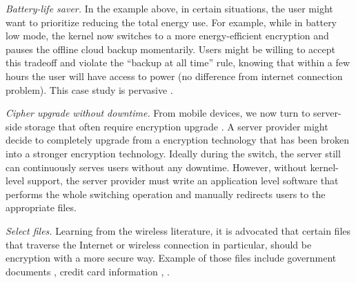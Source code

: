 {\em Battery-life saver.} In the example above, in certain situations, the user
might want to prioritize reducing the total energy use. For example, while in
battery low mode, the kernel now switches to a more energy-efficient encryption
and pauses the offline cloud backup momentarily. Users might be willing to
accept this tradeoff and violate the ``backup at all time'' rule, knowing that
within a few hours the user will have access to power (no difference from
internet connection problem). This case study is pervasive \cite{hackernews-???,
many-more??}.

{\em Cipher upgrade without downtime.} From mobile devices, we now turn to
server-side storage that often require encryption upgrade \cite{some-citations}.
A server provider might decide to completely upgrade from a encryption
technology that has been broken into a stronger encryption technology. Ideally
during the switch, the server still can continuously serves users without any
downtime. However, without kernel-level support, the server provider must write
an application level software that performs the whole switching operation and
manually redirects users to the appropriate files.

{\em Select files.} Learning from the wireless literature, it is advocated that
certain files that traverse the Internet or wireless connection in particular,
should be encryption with a more secure way. Example of those files include
government documents \cite{citation-to-this-example}, credit card information
\cite{a}, \xxx \cite{a, b, c}.


